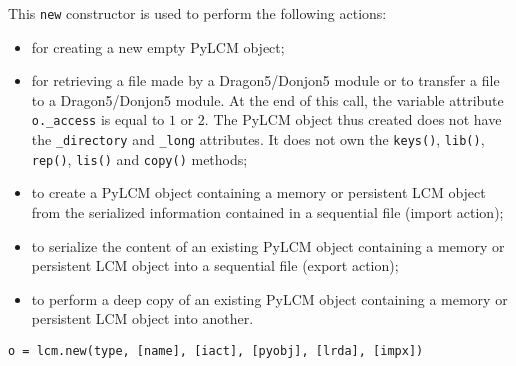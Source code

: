 \vskip 0.2cm

This {\tt new} constructor is used to perform the following actions:
\begin{itemize}
\item for creating a new empty PyLCM object;
\item for retrieving a file made by a Dragon5/Donjon5 module or to transfer a file to a Dragon5/Donjon5 module. At the end of this call, the variable
attribute {\tt o.\_access} is equal to $1$ or  $2$. The PyLCM object thus created does not have
the {\tt \_directory} and {\tt \_long} attributes. It does not own the {\tt keys()},
{\tt lib()}, {\tt rep()}, {\tt lis()} and {\tt copy()} methods;
\item to create a PyLCM object containing a memory or persistent LCM object from the serialized information contained in a sequential file (import action);
\item to serialize the content of an existing PyLCM object containing a memory or persistent LCM object into a sequential file (export action);
\item to perform a deep copy of an existing PyLCM object containing a memory or persistent LCM object into another.
\end{itemize}

\begin{verbatim}
o = lcm.new(type, [name], [iact], [pyobj], [lrda], [impx])
\end{verbatim}

